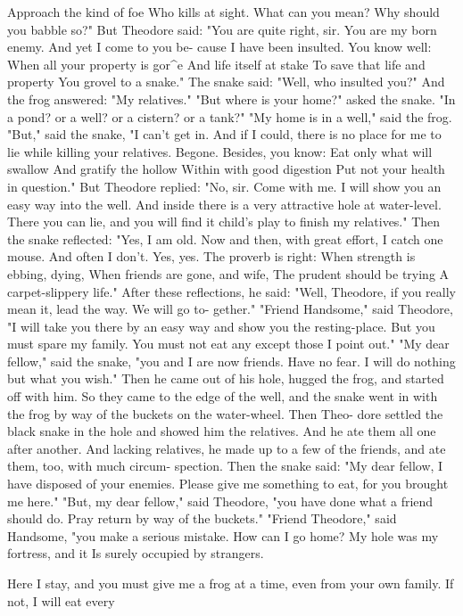 \documentclass{book}
\begin{document}
Approach the kind of foe
Who kills at sight. What can you mean?
Why should you babble so?"
But Theodore said: "You are quite right, sir.
You are my born enemy. And yet I come to you be-
cause I have been insulted. You know well:
When all your property is gor^e
And life itself at stake
To save that life and property
You grovel to a snake."
The snake said: "Well, who insulted you?" And
the frog answered: "My relatives." "But where is
your home?" asked the snake. "In a pond? or a
well? or a cistern? or a tank?" "My home is in a
well," said the frog. "But," said the snake, "I can't
get in. And if I could, there is no place for me to lie
while killing your relatives. Begone. Besides, you
know:
Eat only what will swallow
And gratify the hollow
Within with good digestion
Put not your health in question."
But Theodore replied: "No, sir. Come with me.
I will show you an easy way into the well. And inside
there is a very attractive hole at water-level. There
you can lie, and you will find it child's play to finish
my relatives."
Then the snake reflected: "Yes, I am old. Now
and then, with great effort, I catch one mouse. And
often I don't. Yes, yes. The proverb is right:
When strength is ebbing, dying,
When friends are gone, and wife,
The prudent should be trying
A carpet-slippery life."
After these reflections, he said: "Well, Theodore,
if you really mean it, lead the way. We will go to-
gether." "Friend Handsome," said Theodore, "I
will take you there by an easy way and show you the
resting-place. But you must spare my family. You
must not eat any except those I point out."
"My dear fellow," said the snake, "you and I are
now friends. Have no fear. I will do nothing but
what you wish."
Then he came out of his hole, hugged the frog,
and started off with him. So they came to the edge
of the well, and the snake went in with the frog by
way of the buckets on the water-wheel. Then Theo-
dore settled the black snake in the hole and showed
him the relatives. And he ate them all one after
another. And lacking relatives, he made up to a few
of the friends, and ate them, too, with much circum-
spection.
Then the snake said: "My dear fellow, I have
disposed of your enemies. Please give me something
to eat, for you brought me here."
"But, my dear fellow," said Theodore, "you have
done what a friend should do. Pray return by way of
the buckets."
"Friend Theodore," said Handsome, "you make a
serious mistake. How can I go home? My hole was
my fortress, and it Is surely occupied by strangers.

Here I stay, and you must give me a frog at a time,
even from your own family.  If not, I will eat every
\end{document}
